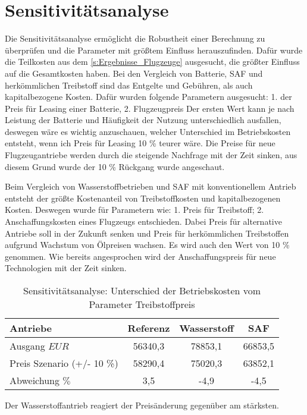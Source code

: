 \section{Sensitivitätsanalyse}
\label{s:Sensitivitätsanalyse}
%
Die Sensitivitätsanalyse ermöglicht die Robustheit einer Berechnung zu überprüfen und die Parameter mit größtem Einfluss herauszufinden. 
Dafür wurde die Teilkosten aus dem \ref{s:Ergebnisse_Flugzeuge} ausgesucht, die größter Einfluss auf die Gesamtkosten haben. 
Bei den Vergleich von Batterie, SAF und herkömmlichen Treibstoff sind das Entgelte und Gebühren, als auch kapitalbezogene Kosten.
Dafür wurden folgende Parametern ausgesucht: 1. der Preis für Leasing einer Batterie, 2. Flugzeugpreis
Der ersten Wert kann je nach Leistung der Batterie und Häufigkeit der Nutzung unterschiedlich ausfallen, deswegen wäre es wichtig anzuschauen,
welcher Unterschied im Betriebskosten entsteht, wenn ich Preis für Leasing 10 \% teurer wäre. Die Preise für neue Flugzeugantriebe
werden durch die steigende Nachfrage mit der Zeit sinken, aus diesem Grund wurde der 10 \% Rückgang wurde angeschaut.

Beim Vergleich von Wasserstoffbetrieben und SAF mit konventionellem Antrieb entsteht der größte Kostenanteil
von Treibstoffkosten und kapitalbezogenen Kosten. Deswegen wurde für Parametern wie: 1. Preis für Treibstoff; 
2. Anschaffungskosten eines Flugzeugs entschieden. Dabei Preis für alternative Antriebe soll in der Zukunft senken und Preis für herkömmlichen
Treibstoffen aufgrund Wachstum von Ölpreisen wachsen. Es wird auch den Wert von 10 \% genommen.
Wie bereits angesprochen wird der Anschaffungspreis für neue Technologien mit der Zeit sinken.

\begin{table}[h]
	\begin{center}
    \caption{Sensitivitätsanalyse: Unterschied der Betriebskosten vom Parameter Treibstoffpreis}
	\label{BA_Infrastrukturtab}
	\begin{tabular}{|l|c|c|c|}
		\hline
		Antriebe & \textbf{Referenz}& \textbf{Wasserstoff}& \textbf{SAF} \\ \hline
		Ausgang $EUR$ & 56340,3 & 78853,1 & 66853,5  \\ \hline
        Preis Szenario (+/- 10 \%) & 58290,4  & 75020,3 & 63852,1 \\ \hline
        Abweichung $\%$ & 3,5 & -4,9 & -4,5 \\ \hline
	\end{tabular}
    \end{center}
\end{table}

Der Wasserstoffantrieb reagiert der Preisänderung gegenüber am stärksten.